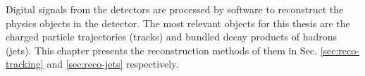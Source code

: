 Digital signals from the detectors are processed by software to reconstruct the physics objects in the detector. The most relevant objects for this thesis are the charged particle trajectories (tracks) and bundled decay products of hadrons (jets). This chapter presents the reconstruction methods of them in Sec. \ref{sec:reco-tracking} and \ref{sec:reco-jets} respectively. 

